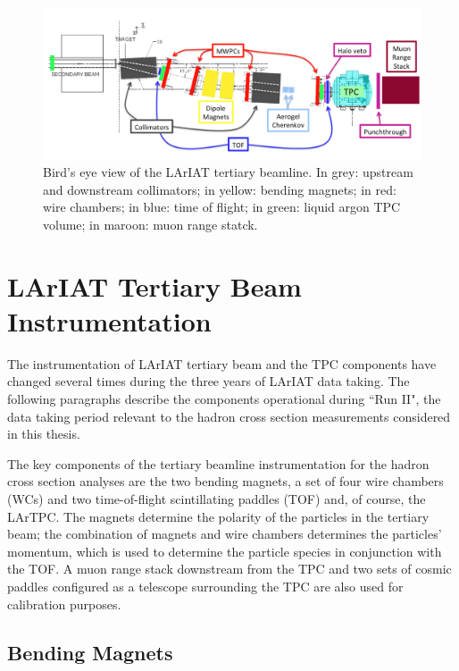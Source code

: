 \begin{figure}
  \centering  	
\includegraphics[width=\textwidth,height=\textheight,keepaspectratio]{Chapter-3/Images/Tertiary.png}
\caption{Bird's eye view of the LArIAT tertiary beamline. In grey: upstream and downstream collimators; in yellow: bending magnets; in red: wire chambers; in blue: time of flight; in green: liquid argon TPC volume; in maroon: muon range statck.}
\label{fig:tert-layout}
\end{figure}


\section{LArIAT Tertiary Beam Instrumentation}\label{sec:Instrumentation}

The instrumentation of  LArIAT tertiary beam and the TPC components have changed several times during the three years of LArIAT data taking. The following paragraphs describe the components operational during ``Run II", the data taking period relevant to the hadron cross section measurements considered in this thesis.

The key components of the tertiary beamline instrumentation for the hadron cross section analyses are the two bending magnets, a set of four wire chambers (WCs) and two time-of-flight scintillating paddles (TOF) and, of course, the LArTPC.  The magnets determine the polarity of the particles in the tertiary beam; the combination of magnets and wire chambers determines the particles' momentum, which is used to determine the particle species in conjunction with the TOF.
A muon range stack downstream from the TPC and two sets of cosmic paddles configured as a telescope surrounding the TPC are also used for calibration purposes.


\subsection{Bending Magnets}\label{sec:Magnets}

